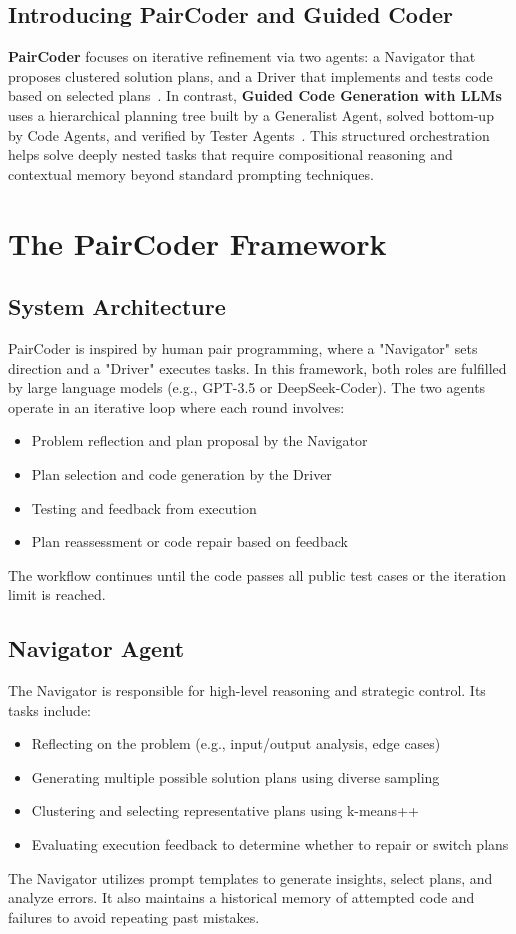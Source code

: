 \documentclass[11pt,a4paper]{article}
\begin{document}
\subsection{Introducing PairCoder and Guided Coder}
\textbf{PairCoder} focuses on iterative refinement via two agents: a Navigator that proposes clustered solution plans, and a Driver that implements and tests code based on selected plans~\cite{zhang2024paircoder}. In contrast, \textbf{Guided Code Generation with LLMs} uses a hierarchical planning tree built by a Generalist Agent, solved bottom-up by Code Agents, and verified by Tester Agents~\cite{almorsi2025guided}. This structured orchestration helps solve deeply nested tasks that require compositional reasoning and contextual memory beyond standard prompting techniques.


\section{The PairCoder Framework}
\subsection{System Architecture}
PairCoder is inspired by human pair programming, where a "Navigator" sets direction and a "Driver" executes tasks. In this framework, both roles are fulfilled by large language models (e.g., GPT-3.5 or DeepSeek-Coder). The two agents operate in an iterative loop where each round involves:
\begin{itemize}
\item Problem reflection and plan proposal by the Navigator
\item Plan selection and code generation by the Driver
\item Testing and feedback from execution
\item Plan reassessment or code repair based on feedback
\end{itemize}

The workflow continues until the code passes all public test cases or the iteration limit is reached.

\subsection{Navigator Agent}
The Navigator is responsible for high-level reasoning and strategic control. Its tasks include:
\begin{itemize}
\item Reflecting on the problem (e.g., input/output analysis, edge cases)
\item Generating multiple possible solution plans using diverse sampling
\item Clustering and selecting representative plans using k-means++
\item Evaluating execution feedback to determine whether to repair or switch plans
\end{itemize}
The Navigator utilizes prompt templates to generate insights, select plans, and analyze errors. It also maintains a historical memory of attempted code and failures to avoid repeating past mistakes.
\end{document}
